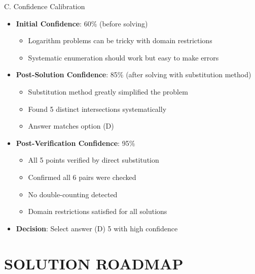 \documentclass[12pt]{article}
\begin{document}
\begin{verificationbox}{C. Confidence Calibration}
\begin{itemize}[leftmargin=*]
    \item \textbf{Initial Confidence}: 60\% (before solving)
    \begin{itemize}
        \item Logarithm problems can be tricky with domain restrictions
        \item Systematic enumeration should work but easy to make errors
    \end{itemize}
    
    \item \textbf{Post-Solution Confidence}: 85\% (after solving with substitution method)
    \begin{itemize}
        \item Substitution method greatly simplified the problem
        \item Found 5 distinct intersections systematically
        \item Answer matches option (D)
    \end{itemize}
    
    \item \textbf{Post-Verification Confidence}: 95\%
    \begin{itemize}
        \item All 5 points verified by direct substitution
        \item Confirmed all 6 pairs were checked
        \item No double-counting detected
        \item Domain restrictions satisfied for all solutions
    \end{itemize}
    
    \item \textbf{Decision}: Select answer (D) 5 with high confidence
\end{itemize}
\end{verificationbox}

\section{SOLUTION ROADMAP}
\end{document}
